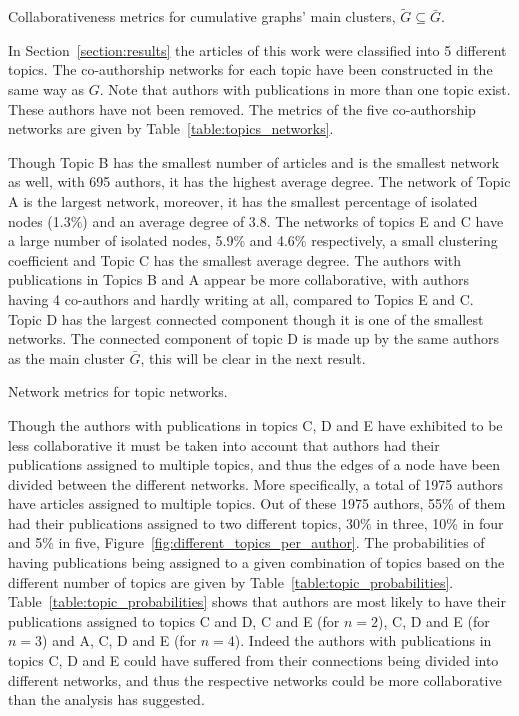 \documentclass{article}
\theoremstyle{definition}
\begin{document}
\begin{table}[!hbtp]
    \centering
    \resizebox{\textwidth}{!}{
    }
    \caption{Collaborativeness metrics for cumulative graphs' main clusters, \(\tilde{G} \subseteq \bar{G}\).}\label{table:clusters_cumulative}
\end{table}

In Section~\ref{section:results} the articles of this work were classified into
5 different topics. The co-authorship networks for each topic have been
constructed in the same way as \(G\). Note that authors with publications in more
than one topic exist. These authors have not been removed.
The metrics of the five co-authorship networks are given
by Table~\ref{table:topics_networks}.

Though Topic B has the smallest number of articles and is the smallest network
as well, with 695 authors, it has the highest average degree.
The network of Topic A is the largest network, moreover, it has the smallest
percentage of isolated nodes (1.3\%) and an average degree of 3.8. The networks
of topics E and C have a large number of isolated nodes, 5.9\% and 4.6\%
respectively, a small clustering coefficient and Topic C has the smallest
average degree. The authors with publications in Topics B and A appear be more
collaborative, with authors having 4 co-authors and hardly writing at all,
compared to Topics E and C. Topic D has the largest connected component though
it is one of the smallest networks. The connected component of topic D is made
up by the same authors as the main cluster \(\bar{G}\), this will be clear in
the next result.

\begin{table}[H]
    \centering
    \resizebox{\textwidth}{!}{
    }
    \caption{Network metrics for topic networks.}\label{table:topics_networks}
\end{table}

Though the authors with publications in topics C, D and E have exhibited to be
less collaborative it must be taken into account that authors had their
publications assigned to multiple topics, and thus the edges of a node have been
divided between the different networks. More specifically, a total of 1975
authors have articles assigned to multiple topics. Out of these 1975 authors,
55\% of them had their publications assigned to two different topics, 30\% in
three, 10\% in four and 5\% in five,
Figure~\ref{fig:different_topics_per_author}. The probabilities of having
publications being assigned to a given combination of topics based on the
different number of topics are given by Table~\ref{table:topic_probabilities}.
Table~\ref{table:topic_probabilities} shows that authors are most likely to have
their publications assigned to topics C and D, C and E (for \(n=2\)), C, D and E
(for \(n=3\)) and A, C, D and E (for \(n=4\)). Indeed the authors with
publications in topics C, D and E could have suffered from their connections
being divided into different networks, and thus the respective networks could be
more collaborative than the analysis has suggested.
\end{document}
